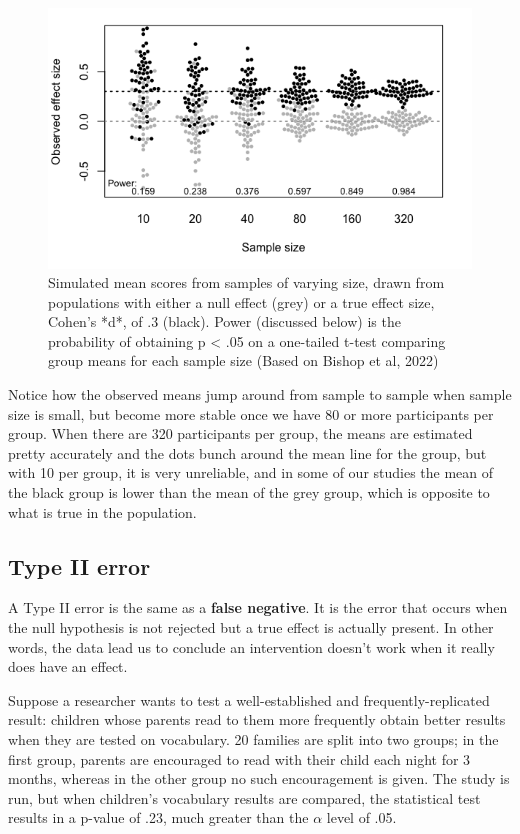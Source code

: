 \documentclass{krantz}
\begin{document}
\begin{figure}
\includegraphics[width=1\linewidth]{images_bw/beeswarms_ch10} \caption{Simulated mean scores from samples of varying size, drawn from populations with either a null effect (grey) or a true effect size, Cohen's *d*, of .3 (black). Power (discussed below) is the probability of obtaining p < .05 on a one-tailed t-test comparing group means for each sample size (Based on Bishop et al, 2022)}\label{fig:varES}
\end{figure}

Notice how the observed means jump around from sample to sample when sample size is small, but become more stable once we have 80 or more participants per group. When there are 320 participants per group, the means are estimated pretty accurately and the dots bunch around the mean line for the group, but with 10 per group, it is very unreliable, and in some of our studies the mean of the black group is lower than the mean of the grey group, which is opposite to what is true in the population.

\hypertarget{type-ii-error}{%
\subsection{Type II error}\label{type-ii-error}}

A Type II error is the same as a \textbf{false negative}. It is the error that occurs when the null hypothesis is not rejected but a true effect is actually present. In other words, the data lead us to conclude an intervention doesn't work when it really does have an effect.

Suppose a researcher wants to test a well-established and frequently-replicated result: children whose parents read to them more frequently obtain better results when they are tested on vocabulary. 20 families are split into two groups; in the first group, parents are encouraged to read with their child each night for 3 months, whereas in the other group no such encouragement is given. The study is run, but when children's vocabulary results are compared, the statistical test results in a p-value of .23, much greater than the \(\alpha\) level of .05.
\end{document}
